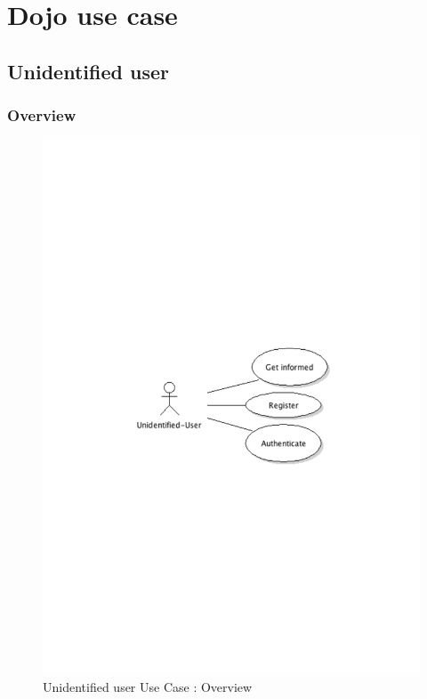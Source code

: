 \chapter{Dojo use case}

\section{Unidentified user}
	\subsection{Overview}
		\begin{figure}[ht]
			\begin{center}
				\includegraphics[width=\textwidth,  trim=2cm 12cm 2cm 11cm]{UML_figure/UC/uni_user/UC_UniUser_General.pdf}
				\caption{Unidentified user Use Case : Overview}
			\end{center}
		\end{figure}
